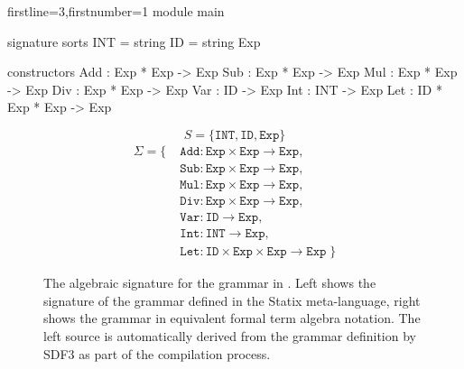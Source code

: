 \newsavebox{\sdfsignaturebox}
\begin{lrbox}{\sdfsignaturebox}\begin{minipage}{.45\textwidth}
\begin{statix*}{firstline=3,firstnumber=1}
module main

signature
  sorts
    INT = string
    ID = string
    Exp

  constructors
    Add : Exp * Exp -> Exp
    Sub : Exp * Exp -> Exp
    Mul : Exp * Exp -> Exp
    Div : Exp * Exp -> Exp
    Var : ID -> Exp
    Int : INT -> Exp
    Let : ID * Exp * Exp -> Exp
\end{statix*}
\end{minipage}
\end{lrbox}

\begin{figure}
  \centering
  \begin{subfigure}{.45\textwidth}
    \centering
    \usebox{\sdfsignaturebox}
  \end{subfigure}\hfill%
  \begin{subfigure}{.5\textwidth}
    \centering
    $$ S = \{\texttt{INT}, \texttt{ID}, \texttt{Exp}\} $$
    \begin{equation*}
    \begin{aligned}
    \Sigma = \{ \; & \texttt{Add} : \texttt{Exp} \times \texttt{Exp} \to \texttt{Exp}, \\
                  & \texttt{Sub} : \texttt{Exp} \times \texttt{Exp} \to \texttt{Exp}, \\
                  & \texttt{Mul} : \texttt{Exp} \times \texttt{Exp} \to \texttt{Exp}, \\
                  & \texttt{Div} : \texttt{Exp} \times \texttt{Exp} \to \texttt{Exp}, \\
                  & \texttt{Var} : \texttt{ID} \to \texttt{Exp}, \\
                  & \texttt{Int} : \texttt{INT} \to \texttt{Exp}, \\
                  & \texttt{Let} : \texttt{ID} \times \texttt{Exp} \times \texttt{Exp} \to \texttt{Exp} \; \}
    \end{aligned}
    \end{equation*}
  \end{subfigure}
  \caption{The algebraic signature for the grammar in . Left shows the signature of the grammar defined in the Statix meta-language, right shows the grammar in equivalent formal term algebra notation. The left source is automatically derived from the grammar definition by SDF3 as part of the compilation process.}
  \label{fig:sdf3_example_signature}
\end{figure}

